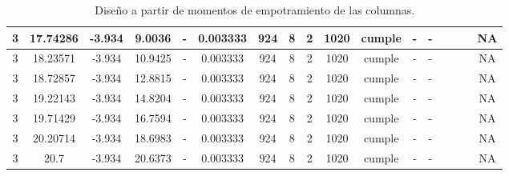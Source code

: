 \begin{table}[H]
{\begin{tabular}{|c|c|c|c|c|c|c|c|c|c|c|c|c|c|c|c|c|}
\hline
3   & 17.74286 & -3.934 & 9.0036 & -   & 0.003333 & 924 & 8   & 2   & 1020 & \cellcolor[rgb]{ .776,  .937,  .808}\textcolor[rgb]{ 0,  .38,  0}{cumple} & -   & -   &     &     &     & NA \bigstrut\\
\hline
3   & 18.23571 & -3.934 & 10.9425 & -   & 0.003333 & 924 & 8   & 2   & 1020 & \cellcolor[rgb]{ .776,  .937,  .808}\textcolor[rgb]{ 0,  .38,  0}{cumple} & -   & -   &     &     &     & NA \bigstrut\\
\hline
3   & 18.72857 & -3.934 & 12.8815 & -   & 0.003333 & 924 & 8   & 2   & 1020 & \cellcolor[rgb]{ .776,  .937,  .808}\textcolor[rgb]{ 0,  .38,  0}{cumple} & -   & -   &     &     &     & NA \bigstrut\\
\hline
3   & 19.22143 & -3.934 & 14.8204 & -   & 0.003333 & 924 & 8   & 2   & 1020 & \cellcolor[rgb]{ .776,  .937,  .808}\textcolor[rgb]{ 0,  .38,  0}{cumple} & -   & -   &     &     &     & NA \bigstrut\\
\hline
3   & 19.71429 & -3.934 & 16.7594 & -   & 0.003333 & 924 & 8   & 2   & 1020 & \cellcolor[rgb]{ .776,  .937,  .808}\textcolor[rgb]{ 0,  .38,  0}{cumple} & -   & -   &     &     &     & NA \bigstrut\\
\hline
3   & 20.20714 & -3.934 & 18.6983 & -   & 0.003333 & 924 & 8   & 2   & 1020 & \cellcolor[rgb]{ .776,  .937,  .808}\textcolor[rgb]{ 0,  .38,  0}{cumple} & -   & -   &     &     &     & NA \bigstrut\\
\hline
3   & 20.7 & -3.934 & 20.6373 & -   & 0.003333 & 924 & 8   & 2   & 1020 & \cellcolor[rgb]{ .776,  .937,  .808}\textcolor[rgb]{ 0,  .38,  0}{cumple} & -   & -   &     &     &     & NA \bigstrut\\
\hline
\end{tabular}%


        
}%
    \caption{Diseño a partir de momentos de empotramiento de las columnas.}
    \label{tab:moment.emp}
\end{table}